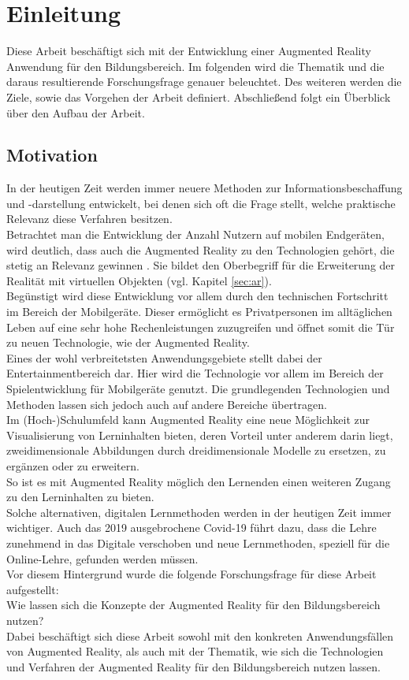 \chapter{Einleitung}\label{chapter:einleitung}
Diese Arbeit beschäftigt sich mit der Entwicklung einer Augmented Reality Anwendung für den Bildungsbereich. Im folgenden wird die Thematik und die daraus resultierende Forschungsfrage genauer beleuchtet. Des weiteren werden die Ziele, sowie das Vorgehen der Arbeit definiert. Abschließend folgt ein Überblick über den Aufbau der Arbeit.

\section{Motivation}\label{sec:motivation}
In der heutigen Zeit werden immer neuere Methoden zur Informationsbeschaffung und -darstellung entwickelt, bei denen sich oft die Frage stellt, welche praktische Relevanz diese Verfahren besitzen. \\
Betrachtet man die Entwicklung der Anzahl Nutzern auf mobilen Endgeräten, wird deutlich, dass auch die Augmented Reality zu den Technologien gehört, die stetig an Relevanz gewinnen \citep{statista:ar-users}. Sie bildet den Oberbegriff für die Erweiterung der Realität mit virtuellen Objekten (vgl. Kapitel \ref{sec:ar}). \\
Begünstigt wird diese Entwicklung vor allem durch den technischen Fortschritt im Bereich der Mobilgeräte. Dieser ermöglicht es Privatpersonen im alltäglichen Leben auf eine sehr hohe Rechenleistungen zuzugreifen und öffnet somit die Tür zu neuen Technologie, wie der Augmented Reality. \\
Eines der wohl verbreitetsten Anwendungsgebiete stellt dabei der Entertainmentbereich dar. Hier wird die Technologie vor allem im Bereich der Spielentwicklung für Mobilgeräte genutzt. Die grundlegenden Technologien und Methoden lassen sich jedoch auch auf andere Bereiche übertragen. \\
Im (Hoch-)Schulumfeld kann Augmented Reality eine neue Möglichkeit zur Visualisierung von Lerninhalten bieten, deren Vorteil unter anderem darin liegt, zweidimensionale Abbildungen durch dreidimensionale Modelle zu ersetzen, zu ergänzen oder zu erweitern. \\
So ist es mit Augmented Reality möglich den Lernenden einen weiteren Zugang zu den Lerninhalten zu bieten. \\
Solche alternativen, digitalen Lernmethoden werden in der heutigen Zeit immer wichtiger. Auch das 2019 ausgebrochene Covid-19 führt dazu, dass die Lehre zunehmend in das Digitale verschoben und neue Lernmethoden, speziell für die Online-Lehre, gefunden werden müssen. \\
Vor diesem Hintergrund wurde die folgende Forschungsfrage für diese Arbeit aufgestellt:\\
\glqq Wie lassen sich die Konzepte der Augmented Reality für den Bildungsbereich nutzen?\grqq \\
Dabei beschäftigt sich diese Arbeit sowohl mit den konkreten Anwendungsfällen von Augmented Reality, als auch mit der Thematik, wie sich die Technologien und Verfahren der Augmented Reality für den Bildungsbereich nutzen lassen. 

